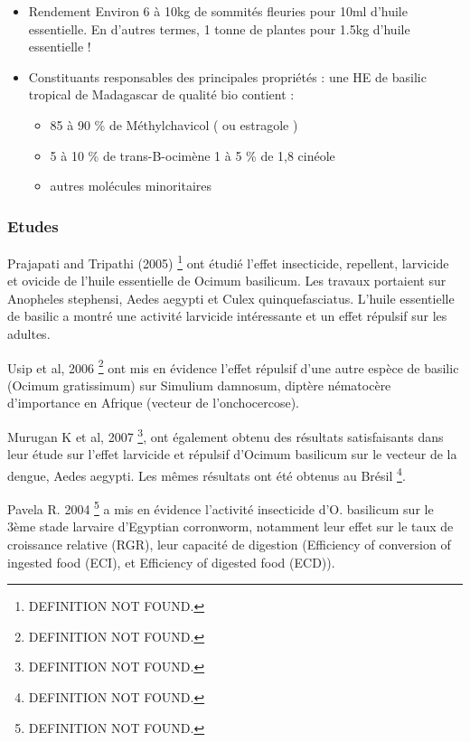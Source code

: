 \documentclass[12pt,a4wide]{article}
\begin{document}
\begin{itemize}
\item Rendement  Environ   6  à  10kg   de  sommités  fleuries  pour   10ml  d'huile
essentielle. En d'autres termes, 1 tonne de plantes pour 1.5kg d'huile essentielle !

\item Constituants  responsables des  principales  propriétés :  une  HE de  basilic
tropical de Madagascar de qualité bio contient  : 
\begin{itemize}
\item 85  à 90  \%  de Méthylchavicol  ( ou  estragole  )
\item 5  à  10 \%  de trans-B-ocimène 1 à 5 \% de 1,8 cinéole
\item autres molécules minoritaires
\end{itemize}
\end{itemize}


\subsubsection{Etudes}
\label{sec-4-3-4}

Prajapati and  Tripathi (2005) \footnote{DEFINITION NOT FOUND.}  ont étudié l'effet  insecticide, repellent,
larvicide et  ovicide de l'huile  essentielle de Ocimum basilicum.   Les travaux
portaient  sur Anopheles  stephensi,  Aedes aegypti  et Culex  quinquefasciatus.
L'huile essentielle de  basilic a montré une activité  larvicide intéressante et
un effet répulsif sur les adultes.

Usip et al, 2006 \footnote{DEFINITION NOT FOUND.} ont mis en évidence l'effet répulsif d'une autre espèce de
basilic  (Ocimum   gratissimum)  sur   Simulium  damnosum,   diptère  nématocère
d'importance en Afrique (vecteur de l'onchocercose).

Murugan K  et al, 2007  \footnote{DEFINITION NOT FOUND.}, ont  également obtenu des  résultats satisfaisants
dans leur  étude sur  l'effet larvicide  et répulsif  d'Ocimum basilicum  sur le
vecteur de  la dengue,  Aedes aegypti.  Les mêmes résultats  ont été  obtenus au
Brésil \footnote{DEFINITION NOT FOUND.}.

Pavela R. 2004 \footnote{DEFINITION NOT FOUND.} a mis  en évidence l'activité insecticide d'O. basilicum sur
le 3ème stade  larvaire d'Egyptian corronworm, notamment leur effet  sur le taux
de  croissance  relative  (RGR),  leur  capacité  de  digestion  (Efficiency  of
conversion of ingested food (ECI), et Efficiency of digested food (ECD)).
\end{document}
